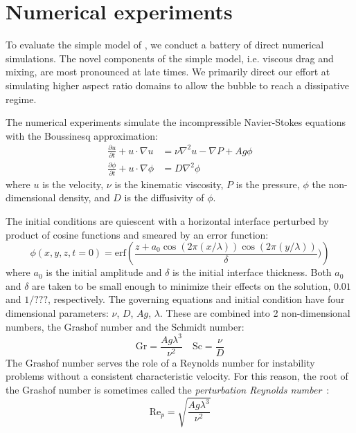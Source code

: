\section{Numerical experiments}

To evaluate the simple model of , we conduct a battery of direct numerical simulations.
The novel components of the simple model, i.e. viscous drag and mixing, are most pronounced at late times.
We primarily direct our effort at simulating higher aspect ratio domains to allow the bubble to reach a dissipative regime.

The numerical experiments simulate the incompressible Navier-Stokes equations with the Boussinesq approximation:
\begin{align}
\frac{\partial u}{\partial t} + u \cdot \nabla u &= \nu \nabla^2 u - \nabla P + A g \phi \\
\frac{\partial \phi}{\partial t} + u \cdot \nabla \phi &= D \nabla^2 \phi 
\end{align}
where $u$ is the velocity,
$\nu$ is the kinematic viscosity,
$P$ is the pressure,
$\phi$ the non-dimensional density,
and $D$ is the diffusivity of $\phi$.

The initial conditions are quiescent with a horizontal interface perturbed by product of cosine functions and smeared by an error function:
\begin{equation}
\phi(x,y,z,t=0) = \text{erf}\left(\frac{z + a_0 \cos(2 \pi (x/\lambda)) \cos(2 \pi (y/\lambda))}{\delta})\right)
\end{equation}
where $a_0$ is the initial amplitude and $\delta$ is the initial interface thickness.
Both $a_0$ and $\delta$ are taken to be small enough to minimize their effects on the solution, $0.01$ and $1/???$, respectively.
The governing equations and initial condition have four dimensional parameters: $\nu$, $D$, $Ag$, $\lambda$.
These are combined into 2 non-dimensional numbers, the Grashof number and the Schmidt number:
\begin{equation}
\text{Gr} = \frac{A g \lambda^3}{\nu^2} \quad \text{Sc} = \frac{\nu}{D}
\end{equation}
The Grashof number serves the role of a Reynolds number for instability problems without a consistent characteristic velocity.
For this reason, the root of the Grashof number is sometimes called the \textit{perturbation Reynolds number}~\cite{Wei2011}:
\begin{equation}
\text{Re}_p = \sqrt{\frac{A g \lambda^3}{\nu^2}}
\end{equation}

